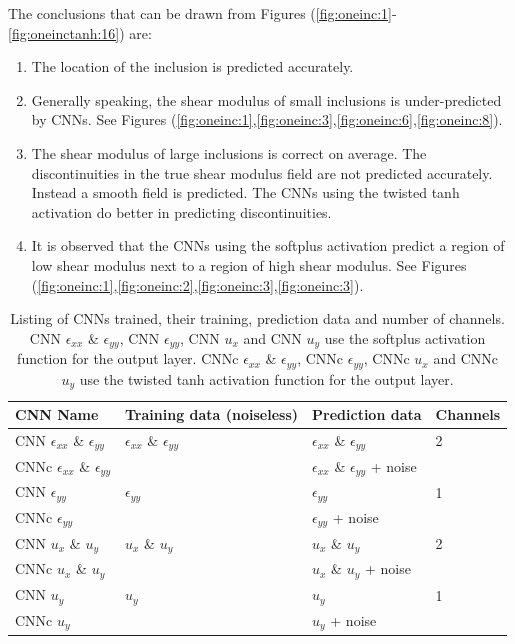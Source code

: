 \documentclass[12pt]{article}
\begin{document}
The conclusions that can be drawn from Figures (\ref{fig:oneinc:1}-\ref{fig:oneinctanh:16}) are:
\begin{enumerate}
\item{The location of the inclusion is predicted accurately.}
\item{Generally speaking, the shear modulus of small inclusions is under-predicted by CNNs. See Figures (\ref{fig:oneinc:1},\ref{fig:oneinc:3},\ref{fig:oneinc:6},\ref{fig:oneinc:8}).}
\item{The shear modulus of large inclusions is correct on average. The discontinuities in the true shear modulus field are not predicted accurately. Instead a smooth field is predicted. The CNNs using the twisted tanh activation do better in predicting discontinuities.}
\item{It is observed that the CNNs using the softplus activation predict a region of low shear modulus next to a region of high shear modulus. See Figures (\ref{fig:oneinc:1},\ref{fig:oneinc:2},\ref{fig:oneinc:3},\ref{fig:oneinc:3}).}
\end{enumerate}
%
\begin{center}
\begin{table}
  \centering
  \begin{tabular}{|p{3cm}|p{2cm}|p{3cm}|p{1.5cm}|}
    \hline
    CNN Name & Training data (noiseless) & Prediction data & Channels\\
    \hline
    CNN $\epsilon_{xx}$ \& $\epsilon_{yy}$ &  $\epsilon_{xx}$ \& $\epsilon_{yy}$ & $\epsilon_{xx}$ \& $\epsilon_{yy}$ & 2\\
    CNNc $\epsilon_{xx}$ \& $\epsilon_{yy}$ &  & $\epsilon_{xx}$ \& $\epsilon_{yy}$ + noise & \\
    \hline
    CNN $\epsilon_{yy}$ & $\epsilon_{yy}$ & $\epsilon_{yy}$ & 1\\
    CNNc $\epsilon_{yy}$ &  & $\epsilon_{yy}$ + noise & \\
    \hline
    CNN $u_x$ \& $u_y$ & $u_x$ \& $u_y$ & $u_x$ \& $u_y$ & 2\\
    CNNc $u_x$ \& $u_y$&  & $u_x$ \& $u_y$ + noise & \\    
    \hline
    CNN $u_y$  & $u_y$ & $u_y$ & 1\\
    CNNc $u_y$ &  & $u_y$ + noise & \\
    \hline
  \end{tabular}
  \caption{\label{tab:cnnone:io} Listing of CNNs trained, their training, prediction data and number of channels. CNN $\epsilon_{xx}$ \& $\epsilon_{yy}$, CNN $\epsilon_{yy}$, CNN $u_x$  and CNN $u_y$ use the softplus activation function for the output layer. CNNc $\epsilon_{xx}$ \& $\epsilon_{yy}$, CNNc $\epsilon_{yy}$, CNNc $u_x$  and CNNc $u_y$ use the twisted tanh activation function for the output layer.}
\end{table}
\end{center}
\end{document}
